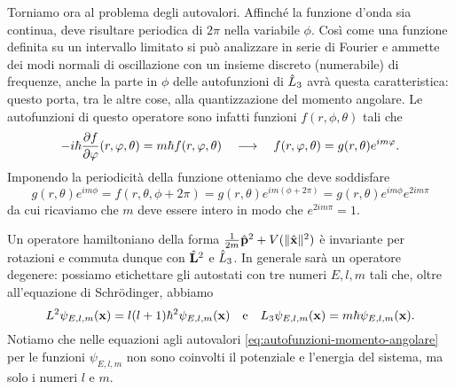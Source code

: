Torniamo ora al problema degli autovalori.
Affinch\'e la funzione d'onda sia continua, deve risultare periodica di $2\pi$ nella variabile $\phi$.
Cos\`i come una funzione definita su un intervallo limitato si può analizzare in serie di Fourier e ammette dei modi normali di oscillazione con un insieme discreto (numerabile) di frequenze, anche la parte in $\phi$ delle autofunzioni di $\hat{L}_3$ avrà questa caratteristica: questo porta, tra le altre cose, alla quantizzazione del momento angolare.
Le autofunzioni di questo operatore sono infatti funzioni $f(r,\phi,\theta)$ tali che
\begin{equation}
	-i\hbar\frac{\partial {f}}{\partial {\varphi}}(r,\varphi,\theta)=m\hbar f(r,\varphi,\theta)\quad\longrightarrow\quad f(r,\varphi,\theta)=g(r,\theta)e^{im\varphi}.
\end{equation}
Imponendo la periodicità della funzione otteniamo che deve soddisfare
\begin{equation}
	g(r,\theta)e^{im\phi}=f(r,\theta,\phi+2\pi)=g(r,\theta)e^{im(\phi+2\pi)}=g(r,\theta)e^{im\phi}e^{2im\pi}
\end{equation}
da cui ricaviamo che $m$ deve essere intero in modo che $e^{2im\pi}=1$.

Un operatore hamiltoniano della forma $\frac1{2m}\hat{\mathbf{p}}^2+V(\lVert\hat{\mathbf{x}}\rVert^2)$ è invariante per rotazioni e commuta dunque con $\hat{\mathbf{L}}^2$ e $\hat{L}_3$.
In generale sarà un operatore degenere: possiamo etichettare gli autostati con tre numeri $E,l,m$ tali che, oltre all'equazione di Schr\"odinger, abbiamo
\begin{equation}
	L^2\psi_{E,l,m}(\mathbf{x})=l(l+1)\hbar^2\psi_{E,l,m}(\mathbf{x})\quad\text{e}\quad L_3\psi_{E,l,m}(\mathbf{x})=m\hbar\psi_{E,l,m}(\mathbf{x}).
	\label{eq:autofunzioni-momento-angolare}
\end{equation}
Notiamo che nelle equazioni agli autovalori \eqref{eq:autofunzioni-momento-angolare} per le funzioni $\psi_{E,l,m}$ non sono coinvolti il potenziale e l'energia del sistema, ma solo i numeri $l$ e $m$.

